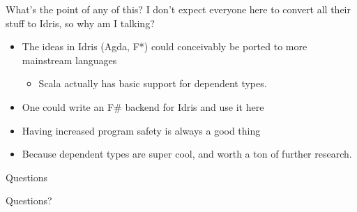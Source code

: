 \documentclass{beamer}
\begin{document}
\begin{frame}{What's the point of any of this? }
 	\transdissolve[duration=0.17]
	I don't expect everyone here to convert all their stuff to Idris, so why am I talking? 
	\begin{itemize}
		\pause
		\item The ideas in Idris (Agda, F*) could conceivably be ported to more mainstream languages \begin{itemize} 
				\pause
				\item Scala actually has basic support for dependent types.
			\end{itemize}	
		\pause
		\item One could write an F\# backend for Idris and use it here
		\item Having increased program safety is always a good thing
		\pause
		\item Because dependent types are super cool, and worth a ton of further research. 
	\end{itemize}
\end{frame}
\begin{frame}{Questions }
	\transdissolve[duration=0.17]
	\begin{center}
		Questions? 
	\end{center}
\end{frame}
\end{document}
